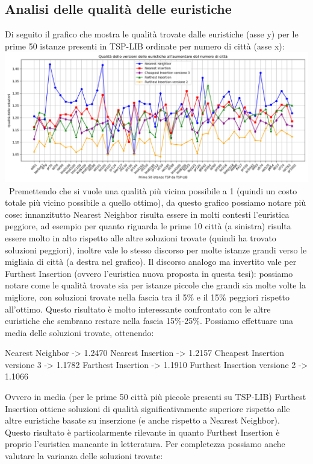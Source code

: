 \documentclass[a4paper,12pt]{report}
\begin{document}
\subsection{Analisi delle qualità delle euristiche}
Di seguito il grafico che mostra le qualità trovate dalle euristiche (asse y) per le prime 50 istanze presenti in TSP-LIB ordinate per numero di città (asse x): \newline
\includegraphics[width=1\textwidth]{../Grafici/7.png} \
Premettendo che si vuole una qualità più vicina possibile a 1 (quindi un costo totale più vicino possibile a quello ottimo), da questo grafico possiamo notare più cose: innanzitutto Nearest Neighbor risulta essere in molti contesti l'euristica peggiore, ad esempio per quanto riguarda le prime 10 città (a sinistra) risulta essere molto in alto rispetto alle altre soluzioni trovate (quindi ha trovato soluzioni peggiori), inoltre vale lo stesso discorso per molte istanze grandi verso le migliaia di città (a destra nel grafico). Il discorso analogo ma invertito vale per Furthest Insertion (ovvero l'euristica nuova proposta in questa tesi): possiamo notare come le qualità trovate sia per istanze piccole che grandi sia molte volte la migliore, con soluzioni trovate nella fascia tra il 5\% e il 15\% peggiori rispetto all'ottimo. Questo risultato è molto interessante confrontato con le altre euristiche che sembrano restare nella fascia 15\%-25\%. Possiamo effettuare una media delle soluzioni trovate, ottenendo:
\begin{myverbatim}
Nearest Neighbor ->              1.2470
Nearest Insertion ->             1.2157
Cheapest Insertion versione 3 -> 1.1782
Farthest Insertion ->            1.1910
Furthest Insertion versione 2 -> 1.1066
\end{myverbatim}
Ovvero in media (per le prime 50 città più piccole presenti su TSP-LIB) Furthest Insertion ottiene soluzioni di qualità significativamente superiore rispetto alle altre euristiche basate su inserzione (e anche rispetto a Nearest Neighbor). Questo risultato è particolarmente rilevante in quanto Furthest Insertion è proprio l'euristica mancante in letteratura. Per completezza possiamo anche valutare la varianza delle soluzioni trovate:
\end{document}
